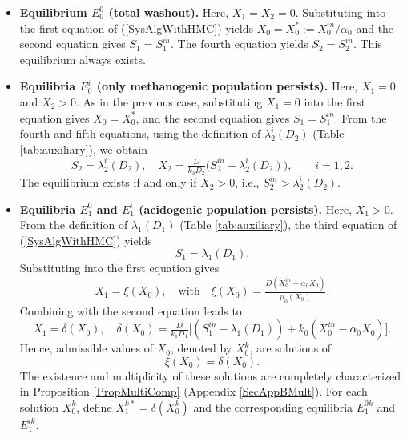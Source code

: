 \documentclass[runningheads]{llncs}
\begin{document}
\begin{itemize}[leftmargin=*,label=\raisebox{0.25ex}{\tiny$\bullet$}]
\item \textbf{Equilibrium $E_0^0$ (total washout).}  
Here, $X_1 = X_2 = 0$. Substituting into the first equation of (\ref{SysAlgWithHMC}) yields $X_0 = X_0^* := X_0^{in}/\alpha_0$
and the second equation gives $S_1 = S_1^{in}$. The fourth equation yields $S_2 = S_2^{in}$. This equilibrium always exists.
\item \textbf{Equilibria $E_0^i$ (only methanogenic population persists).}  
Here, $X_1 = 0$ and $X_2 > 0$. As in the previous case, substituting $X_1=0$ into the first equation gives $X_0 = X_0^*$, and the second equation gives $S_1 = S_1^{in}$. 
From the fourth and fifth equations, using the definition of $\lambda_2^i(D_2)$ (Table \ref{tab:auxiliary}), we obtain
\[
S_2 = \lambda_2^i(D_2), \quad 
X_2 = \tfrac{D}{k_3 D_2}\big(S_2^{in}-\lambda_2^i(D_2)\big), \qquad i=1,2.
\]
The equilibrium exists if and only if $X_2>0$, i.e.,
$S_2^{in}>\lambda_2^i(D_2)$.
\item \textbf{Equilibria $E_1^0$ and $E_1^i$ (acidogenic population persists).}  
Here, $X_1>0$. From the definition of $\lambda_1(D_1)$ (Table \ref{tab:auxiliary}), the third equation of (\ref{SysAlgWithHMC}) yields
\[
S_1 = \lambda_1(D_1).
\]
Substituting into the first equation gives
\[
X_1 = \xi(X_0), \quad \text{with} \quad 
\xi(X_0) = \tfrac{D(X_0^{in}-\alpha_0 X_0)}{\mu_0(X_0)}.
\]
Combining with the second equation leads to
\begin{equation}             \label{ExpDelta}
X_1 = \delta(X_0), \quad 
\delta(X_0) = \tfrac{D}{k_1 D_1} \Big[(S_1^{in}-\lambda_1(D_1)) + k_0 (X_0^{in}-\alpha_0 X_0)\Big].
\end{equation}
Hence, admissible values of $X_0$, denoted by $X_0^k$, are solutions of
\[
\xi(X_0)=\delta(X_0).
\]
The existence and multiplicity of these solutions are completely characterized in Proposition \ref{PropMultiComp} (Appendix \ref{SecAppBMult}). For each solution $X_0^k$, define $X_1^{k*}=\delta(X_0^k)$ and the corresponding equilibria $E_1^{0k}$ and $E_1^{ik}$.
\begin{itemize}[leftmargin=*,label=\raisebox{0.25ex}{\tiny$\bullet$}]

\end{itemize}
\end{itemize}
\end{document}
